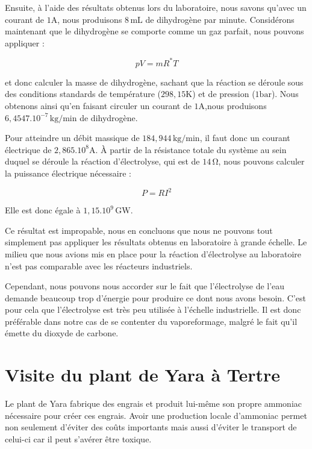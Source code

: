 \documentclass[a4paper, oneside, 12pt]{article}
\begin{document}
Ensuite, à l'aide des résultats obtenus lors du laboratoire, nous savons qu'avec un courant de $1 \si{\ampere}$, nous produisons $8 \, \si{\milli\liter}$ de dihydrogène par minute. Considérons maintenant que le dihydrogène se comporte comme un gaz parfait, nous pouvons appliquer :

\begin{equation*}
	pV = mR^{*}T
\end{equation*}

et donc calculer la masse de dihydrogène, sachant que la réaction se déroule sous des conditions standards de température ($298,15 \si{\kelvin}$) et de pression ($1 \si{\bar}$). Nous obtenons ainsi qu'en faisant circuler un courant de $1 \si{\ampere}$,nous produisons $6,4547.10^{-7} \, \si{\kilo\gram/\minute}$ de dihydrogène.

Pour atteindre un débit massique de $184,944 \, \si{\kilo\gram/\minute}$, il faut donc un courant électrique de $2,865.10^8 \si{\ampere}$. À partir de la résistance
totale du système au sein duquel se déroule la réaction d'électrolyse, qui est de $14 \, \si{\ohm}$, nous pouvons calculer la puissance électrique nécessaire : 

\begin{equation*}
	P = RI^{2}
\end{equation*}

Elle est donc égale à $1,15.10^9 \, \si{\giga\watt}$.

Ce résultat est impropable, nous en concluons que nous ne pouvons tout simplement pas appliquer les résultats obtenus en laboratoire à grande échelle. Le milieu que nous avions mis en place pour la réaction d'électrolyse au laboratoire n'est pas comparable avec les réacteurs industriels.

Cependant, nous pouvons nous accorder sur le fait que l'électrolyse de l'eau demande beaucoup trop d'énergie pour produire ce dont nous avons besoin. C'est pour cela que l'électrolyse est très peu 
utilisée à l'échelle industrielle. Il est donc préférable dans notre cas de se contenter du vaporeformage, malgré le fait qu'il émette du dioxyde de carbone.

\section{Visite du plant de Yara à Tertre}

Le plant de Yara fabrique des engrais et produit lui-même son propre ammoniac nécessaire pour créer ces engrais. Avoir une production locale d'ammoniac permet non seulement 
d'éviter des coûts importants mais aussi d'éviter le transport de celui-ci car il peut s'avérer être toxique.
\end{document}
